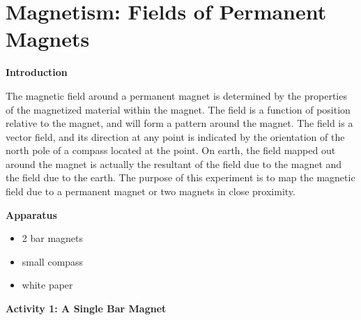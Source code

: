 
\section{Magnetism: Fields of Permanent Magnets }

\makelabheader %

\bigskip
\textbf{Introduction} 

The magnetic field around a permanent magnet is determined by the properties 
of the magnetized material within the magnet. The field is a function of 
position relative to the magnet, and will form a pattern around the magnet. 
The field is a vector field, and its direction at any point is indicated by 
the orientation of the north pole of a compass located at the point. On earth, 
the field mapped out around the magnet is actually the resultant of the field 
due to the magnet and the field due to the earth. The purpose of this 
experiment is to map the magnetic field due to a permanent magnet or two 
magnets in close proximity.

\bigskip
\textbf{Apparatus}
\begin{itemize}[nosep]
\item 2 bar magnets 
\item small compass 
\item white paper
\end{itemize}
\medskip
\textbf{Activity 1: A Single Bar Magnet}

